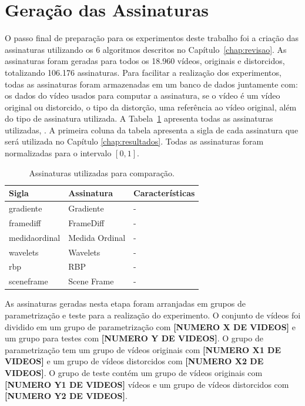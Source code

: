 \section{Geração das Assinaturas}
\label{sec:met-assinaturas}

O passo final de preparação para os experimentos deste trabalho foi a criação das assinaturas utilizando os 6 algoritmos descritos no Capítulo~\ref{chap:revisao}. As assinaturas foram geradas para todos os 18.960 vídeos, originais e distorcidos, totalizando 106.176 assinaturas. Para facilitar a realização dos experimentos, todas as assinaturas foram armazenadas em um banco de dados juntamente com: os dados do vídeo usados para computar a assinatura, se o vídeo é um vídeo original ou distorcido, o tipo da distorção, uma referência ao vídeo original, além do tipo de assinatura utilizada. A Tabela~\ref{tab:assinaturas} apresenta todas as assinaturas utilizadas, . A primeira coluna da tabela apresenta a sigla de cada assinatura que será utilizada no Capítulo \ref{chap:resultados}. Todas as assinaturas foram normalizadas para o intervalo $[0,1]$.


\begin{table}[h]
    \centering
    \caption{Assinaturas utilizadas para comparação.}
    \label{tab:assinaturas}
    \begin{tabular}{|p{}|p{}|p{}|} \hline
        \textbf{Sigla} & \textbf{Assinatura} & \textbf{Características} \\ \hline
        gradiente & Gradiente & - \\ \hline
        framediff & FrameDiff & - \\ \hline
        medidaordinal & Medida Ordinal & - \\ \hline
        wavelets & Wavelets & - \\ \hline
        rbp & RBP & - \\ \hline
        sceneframe & Scene Frame & - \\ \hline
    \end{tabular}
\end{table}

As assinaturas geradas nesta etapa foram arranjadas em grupos de parametrização e teste para a realização do experimento. O conjunto de vídeos foi dividido em um grupo de parametrização com \textbf{[NUMERO X DE VIDEOS]} e um grupo para testes com \textbf{[NUMERO Y DE VIDEOS]}. O grupo de parametrização tem um grupo de vídeos originais com \textbf{[NUMERO X1 DE VIDEOS]} e um grupo de vídeos distorcidos com \textbf{[NUMERO X2 DE VIDEOS]}. O grupo de teste contém um grupo de vídeos originais com \textbf{[NUMERO Y1 DE VIDEOS]} vídeos e um grupo de vídeos distorcidos com \textbf{[NUMERO Y2 DE VIDEOS]}.

